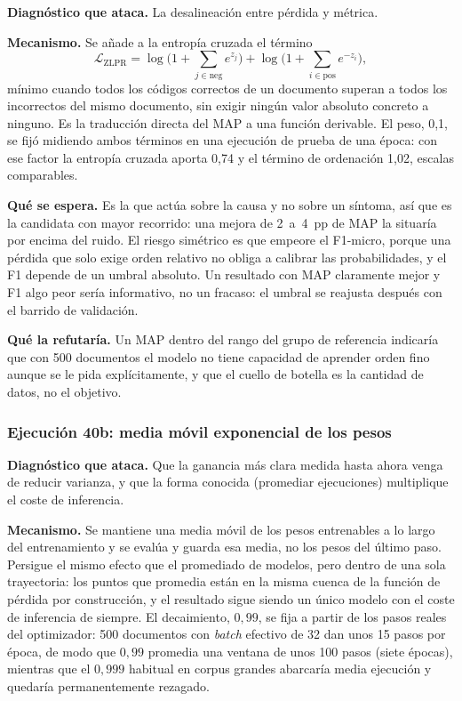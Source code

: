 \textbf{Diagnóstico que ataca.} La desalineación entre pérdida y métrica.

\textbf{Mecanismo.} Se añade a la entropía cruzada el término~\cite{su2022zlpr}
\[
\mathcal{L}_{\text{ZLPR}} = \log\Big(1 + \sum_{j \in \text{neg}} e^{z_j}\Big) + \log\Big(1 + \sum_{i \in \text{pos}} e^{-z_i}\Big),
\]
mínimo cuando todos los códigos correctos de un documento superan a todos los incorrectos del mismo documento, sin exigir ningún valor absoluto concreto a ninguno. Es la traducción directa del MAP a una función derivable. El peso, 0{,}1, se fijó midiendo ambos términos en una ejecución de prueba de una época: con ese factor la entropía cruzada aporta 0{,}74 y el término de ordenación 1{,}02, escalas comparables.

\textbf{Qué se espera.} Es la que actúa sobre la causa y no sobre un síntoma, así que es la candidata con mayor recorrido: una mejora de 2~a~4~pp de MAP la situaría por encima del ruido. El riesgo simétrico es que empeore el F1-micro, porque una pérdida que solo exige orden relativo no obliga a calibrar las probabilidades, y el F1 depende de un umbral absoluto. Un resultado con MAP claramente mejor y F1 algo peor sería informativo, no un fracaso: el umbral se reajusta después con el barrido de validación.

\textbf{Qué la refutaría.} Un MAP dentro del rango del grupo de referencia indicaría que con 500 documentos el modelo no tiene capacidad de aprender orden fino aunque se le pida explícitamente, y que el cuello de botella es la cantidad de datos, no el objetivo.

\subsubsection*{Ejecución 40b: media móvil exponencial de los pesos}

\textbf{Diagnóstico que ataca.} Que la ganancia más clara medida hasta ahora venga de reducir varianza, y que la forma conocida (promediar ejecuciones) multiplique el coste de inferencia.

\textbf{Mecanismo.} Se mantiene una media móvil de los pesos entrenables a lo largo del entrenamiento y se evalúa y guarda esa media, no los pesos del último paso. Persigue el mismo efecto que el promediado de modelos, pero dentro de una sola trayectoria: los puntos que promedia están en la misma cuenca de la función de pérdida por construcción, y el resultado sigue siendo un único modelo con el coste de inferencia de siempre. El decaimiento, $0{,}99$, se fija a partir de los pasos reales del optimizador: 500 documentos con \emph{batch} efectivo de 32 dan unos 15 pasos por época, de modo que $0{,}99$ promedia una ventana de unos 100 pasos (siete épocas), mientras que el $0{,}999$ habitual en corpus grandes abarcaría media ejecución y quedaría permanentemente rezagado.

